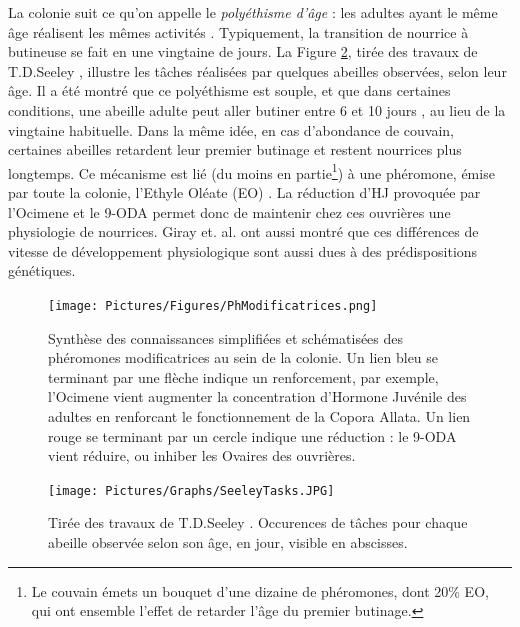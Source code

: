 			 La colonie suit ce qu'on appelle le \textit{polyéthisme d'âge} : les adultes ayant le même âge réalisent les mêmes activités \cite{seeley_age_1991}. Typiquement, la transition de nourrice à butineuse se fait en une vingtaine de jours. La Figure \ref{SeeleyTasks}, tirée des travaux de T.D.Seeley \cite{seeley_wisdom_1995}, illustre les tâches réalisées par quelques abeilles observées, selon leur âge. Il a été montré que ce polyéthisme est souple, et que dans certaines conditions, une abeille adulte peut aller butiner entre 6 et 10 jours \cite{giray_effects_1994}, au lieu de la vingtaine habituelle. Dans la même idée, en cas d'abondance de couvain, certaines abeilles retardent leur premier butinage et restent nourrices plus longtemps. Ce mécanisme est lié (du moins en partie\footnote{Le couvain émets un bouquet d'une dizaine de phéromones, dont 20\% EO, qui ont ensemble l'effet de retarder l'âge du premier butinage.}) à une phéromone, émise par toute la colonie, l'Ethyle Oléate (EO) \cite{le_conte_primer_2001}. La réduction d'HJ provoquée par l'Ocimene et le 9-ODA permet donc de maintenir chez ces ouvrières une physiologie de nourrices. Giray et. al. \cite{giray_effects_1994} ont aussi montré que ces différences de vitesse de développement physiologique sont aussi dues à des prédispositions génétiques.		 
			
			\begin{figure}
			\centering
				\texttt{[image: Pictures/Figures/PhModificatrices.png]}
				\caption[Synthèse des connaissances simplifiées et schématisées des phéromones modificatrices au sein de la colonie.]{Synthèse des connaissances simplifiées et schématisées des phéromones modificatrices au sein de la colonie. Un lien bleu se terminant par une flèche indique un renforcement, par exemple, l'Ocimene vient augmenter la concentration d'Hormone Juvénile des adultes en renforcant le fonctionnement de la Copora Allata. Un lien rouge se terminant par un cercle indique une réduction : le 9-ODA vient réduire, ou inhiber les Ovaires des ouvrières.}
				\label{phMod}
			\end{figure}	
			
			\begin{figure}
			\centering
				\texttt{[image: Pictures/Graphs/SeeleyTasks.JPG]}
				\caption{Tirée des travaux de T.D.Seeley \cite{seeley_wisdom_1995}. Occurences de tâches pour chaque abeille observée selon son âge, en jour, visible en abscisses.}
				\label{SeeleyTasks}
			\end{figure}	
			
